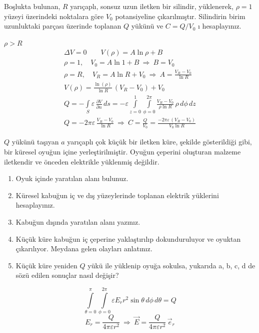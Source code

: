 \documentclass[11pt,a4paper]{article}
\begin{document}
\begin{ornek}[Pr.-7]
Boşlukta bulunan, $R$ yarıçaplı, sonsuz uzun iletken bir silindir, yüklenerek, $\rho=1$ yüzeyi üzerindeki noktalara göre $V_0$ potansiyeline çıkarılmıştır. Silindirin birim uzunluktaki parçası üzerinde toplanan $Q$ yükünü ve $C=Q/V_0$ ı hesaplayınız.
\end{ornek}
$\rho>R$
\begin{gather*}
\Delta V=0\qquad V(\rho)=A\ln\rho+B\\
\rho=1,\quad V_0=A\ln1+B\ \Rightarrow\ B=V_0\\
\rho=R,\quad V_R=A\ln R+V_0\ \Rightarrow\ A=\frac{V_R-V_0}{\ln R}\\
V(\rho)=\frac{\ln(\rho)}{\ln R}\,(V_R-V_0)+V_0\\
Q=-\int\limits_S\varepsilon\,\frac{\partial V}{\partial n}\,ds=-\varepsilon\int\limits_{z=0}^{1}\int\limits_{\phi=0}^{2\pi}\frac{V_R-V_0}{\rho\ln R}\,\rho\,d\phi\,dz\\
Q=-2\pi\varepsilon\,\frac{V_R-V_0}{\ln R}\ \Rightarrow\ C=\frac{Q}{V_0}=\frac{-2\pi\varepsilon\,(V_R-V_0)}{V_0\ln R}
\end{gather*}

\begin{ornek}[Pr.-8]
$Q$ yükünü taşıyan $a$ yarıçaplı çok küçük bir iletken küre, şekilde gösterildiği gibi, bir küresel oyuğun içine yerleştirilmiştir. Oyuğun çeperini oluşturan malzeme iletkendir ve önceden elektrikle yüklenmiş değildir.
\begin{enumerate}[label=\alph*)]
\item Oyuk içinde yaratılan alanı bulunuz.
\item Küresel kabuğun iç ve dış yüzeylerinde toplanan elektrik yüklerini hesaplayınız.
\item Kabuğun dışında yaratılan alanı yazınız.
\item Küçük küre kabuğun iç çeperine yaklaştırılıp dokunduruluyor ve oyuktan çıkarılıyor. Meydana gelen olayları anlatınız.
\item Küçük küre yeniden $Q$ yükü ile yüklenip oyuğa sokulsa, yukarıda a, b, c, d de sözü edilen sonuçlar nasıl değişir?
\end{enumerate}
\end{ornek}
\begin{center}
\end{center}
\[ \int\limits_{\theta=0}^{\pi}\int\limits_{\phi=0}^{2\pi}\varepsilon E_rr^2\sin\theta\,d\phi\,d\theta=Q \]
\[ E_r=\frac{Q}{4\pi\varepsilon r^2}\ \Rightarrow\ \vec E=\frac{Q}{4\pi\varepsilon r^2}\,\vec e_r \]
\end{document}
